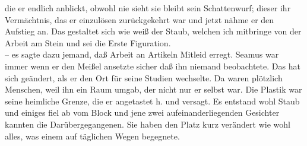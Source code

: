 \documentclass[
]{article}
\begin{document}
die er endlich anblickt, obwohl nie sieht sie bleibt sein Schattenwurf;
dieser ihr Vermächtnis, das er einzulösen zurückgekehrt war und jetzt
nähme er den Aufstieg an. Das gestaltet sich wie weiß der Staub, welchen
ich mitbringe von der Arbeit am Stein und sei die Erste Figuration.\\
-- es sagte dazu jemand, daß Arbeit an Artikeln Mitleid erregt. Seamus
war immer wenn er den Meißel ansetzte sicher daß ihn niemand
beobachtete. Das hat sich geändert, als er den Ort für seine Studien
wechselte. Da waren plötzlich Menschen, weil ihn ein Raum umgab, der
nicht nur er selbst war. Die Plastik war seine heimliche Grenze, die er
angetastet h. und versagt. Es entstand wohl Staub und einiges fiel ab
vom Block und jene zwei aufeinanderliegenden Gesichter kannten die
Darübergegangenen. Sie haben den Platz kurz verändert wie wohl alles,
was einem auf täglichen Wegen begegnete.
\end{document}
